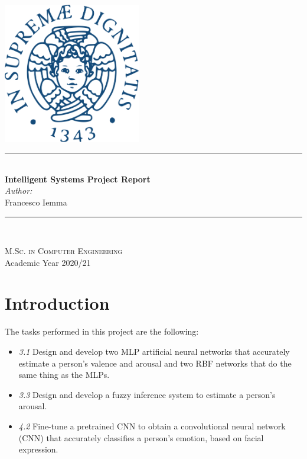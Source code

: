 \documentclass[a4paper]{report}
\newcommand{\HRule}{\rule{\linewidth}{0.5mm}}
\begin{document}
	\begin{titlepage}
		\begin{center}
			
			\includegraphics[width=0.45\textwidth]{img/unipi.png}~\\[2.5cm]
			
			
			\HRule \\[0.4cm]
			{ \LARGE 
				\Huge\textbf{Intelligent Systems Project Report}\\[0.5cm]
				\LARGE\textit{Author:} \\[0.1cm]
				Francesco Iemma \\[0.1cm]
			}
			\HRule \\[1.5cm]
			
			
			
			{ \Large
			}
			
			\vfill
			
			\textsc{\large M.Sc. in Computer Engineering}\\[0.4cm]
			
			
			{\large Academic Year 2020/21}
			
		\end{center}
	\end{titlepage}
	
	
	\tableofcontents
	
\chapter*{Introduction}
	The tasks performed in this project are the following:
	\begin{itemize}
		\item \textit{3.1} Design and develop two MLP artificial neural networks that accurately estimate a person's valence and arousal and two RBF networks that do the same thing as the MLPs.
		
		\item \textit{3.3} Design and develop a fuzzy inference system to estimate a person's arousal.
		
		\item \textit{4.2} Fine-tune a pretrained CNN to  obtain a convolutional neural network (CNN) that accurately classifies a person's emotion, based on facial expression.
	\end{itemize}
\end{document}
